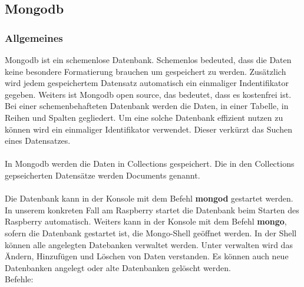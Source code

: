 \subsection{Mongodb}
\subsubsection{Allgemeines}
Mongodb ist ein schemenlose Datenbank. Schemenlos bedeuted, dass die Daten keine besondere Formatierung brauchen um gespeichert zu werden. Zusätzlich wird jedem gespeichertem Datensatz automatisch ein einmaliger Indentifikator gegeben. Weiters ist Mongodb open source, das bedeutet, dass es kostenfrei ist.
\\
Bei einer schemenbehafteten Datenbank werden die Daten, in einer Tabelle, in Reihen und Spalten gegliedert. Um eine solche Datenbank effizient nutzen zu können wird ein einmaliger Identifikator verwendet. Dieser verkürzt das Suchen eines Datensatzes.
\\ \\ 
In Mongodb werden die Daten in Collections gespeichert. Die in den Collections gepseicherten Datensätze werden Documents genannt. 
\\ \\
Die Datenbank kann in der Konsole mit dem Befehl \textbf{mongod} gestartet werden. In unserem konkreten Fall am Raspberry startet die Datenbank beim Starten des Raspberry automatisch. Weiters kann in der Konsole mit dem Befehl \textbf{mongo}, sofern die Datenbank gestartet ist, die Mongo-Shell geöffnet werden. In der Shell können alle angelegten Datebanken verwaltet werden. Unter verwalten wird das Ändern, Hinzufügen und Löschen von Daten verstanden. Es können auch neue Datenbanken angelegt oder alte Datenbanken gelöscht werden. 
\\ Befehle:
